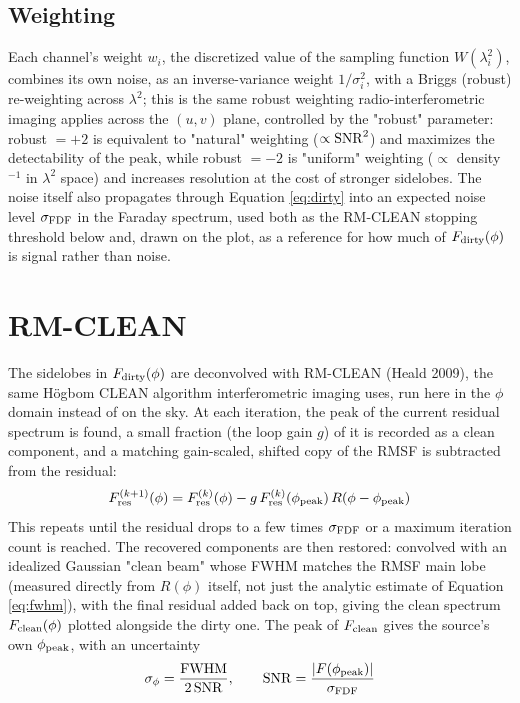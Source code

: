 \subsection{Weighting}
Each channel's weight $w_i$, the discretized value of the sampling function $W(\lambda_i^2)$, combines its own noise, as an inverse-variance weight $1/\sigma_i^2$, with a Briggs (robust) re-weighting across $\lambda^2$; this is the same robust weighting radio-interferometric imaging applies across the $(u,v)$ plane, controlled by the "robust" parameter: robust $=+2$ is equivalent to "natural" weighting ($\propto{\rm SNR}^2$) and maximizes the detectability of the peak, while robust $=-2$ is "uniform" weighting ($\propto$ density$^{-1}$ in $\lambda^2$ space) and increases resolution at the cost of stronger sidelobes. The noise itself also propagates through Equation \ref{eq:dirty} into an expected noise level $\sigma_{\rm FDF}$ in the Faraday spectrum, used both as the RM-CLEAN stopping threshold below and, drawn on the plot, as a reference for how much of $F_{\rm dirty}(\phi)$ is signal rather than noise.
\\

\section{RM-CLEAN}
The sidelobes in $F_{\rm dirty}(\phi)$ are deconvolved with RM-CLEAN (Heald 2009), the same Högbom CLEAN algorithm interferometric imaging uses, run here in the $\phi$ domain instead of on the sky. At each iteration, the peak of the current residual spectrum is found, a small fraction (the loop gain $g$) of it is recorded as a clean component, and a matching gain-scaled, shifted copy of the RMSF is subtracted from the residual:
\begin{equation}\label{eq:clean_iter}
    \displaystyle F_{\rm res}^{(k+1)}(\phi) = F_{\rm res}^{(k)}(\phi) - g\,F_{\rm res}^{(k)}(\phi_{\rm peak})\,R(\phi-\phi_{\rm peak})
\end{equation}
This repeats until the residual drops to a few times $\sigma_{\rm FDF}$ or a maximum iteration count is reached. The recovered components are then restored: convolved with an idealized Gaussian "clean beam" whose FWHM matches the RMSF main lobe (measured directly from $R(\phi)$ itself, not just the analytic estimate of Equation \ref{eq:fwhm}), with the final residual added back on top, giving the clean spectrum $F_{\rm clean}(\phi)$ plotted alongside the dirty one. The peak of $F_{\rm clean}$ gives the source's own $\phi_{\rm peak}$, with an uncertainty
\begin{equation}\label{eq:phierr}
    \displaystyle \sigma_\phi = \frac{{\rm FWHM}}{2\,{\rm SNR}}, \qquad {\rm SNR}=\frac{|F(\phi_{\rm peak})|}{\sigma_{\rm FDF}}
\end{equation}
\\

